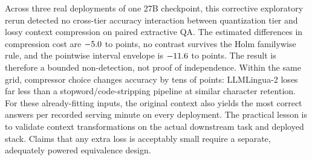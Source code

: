 \documentclass[11pt]{article}
\begin{document}
Across three real deployments of one 27B checkpoint, this corrective
exploratory rerun detected no cross-tier accuracy interaction between
quantization tier and lossy context compression on paired extractive QA. The
estimated differences in compression cost are $-5.0$ to
\PtwoInterDeltaMax{} points, no contrast survives the Holm familywise rule,
and the pointwise interval envelope is $-11.6$ to
\PtwoInterCiHighMax{} points. The result is therefore a bounded non-detection,
not proof of
independence. Within the same grid, compressor choice changes accuracy by tens
of points: LLMLingua-2 loses far less than a stopword/code-stripping pipeline
at similar character retention. For these already-fitting inputs, the original
context also yields the most correct answers per recorded serving minute on
every deployment. The
practical lesson is to validate context transformations on the actual
downstream task and deployed stack. Claims that any extra loss is acceptably
small require a separate, adequately powered equivalence design.



\end{document}
